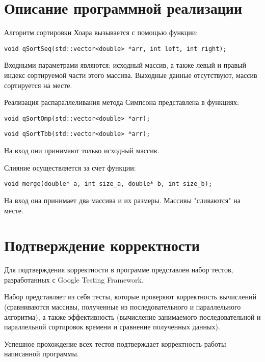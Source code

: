 \documentclass{report}
\begin{document}
\section*{Описание программной реализации}
Алгоритм сортировки Хоара вызывается с помощью функции:
\begin{lstlisting}
void qSortSeq(std::vector<double> *arr, int left, int right);
\end{lstlisting}
\par Входными параметрами являются: исходный массив, а также левый и правый индекс сортируемой части этого массива. Выходные данные отсутствуют, массив сортируется на месте.
\par Реализация распараллеливания метода Симпсона представлена в функциях:
\begin{lstlisting}
void qSortOmp(std::vector<double> *arr);
\end{lstlisting}
\begin{lstlisting}
void qSortTbb(std::vector<double> *arr);
\end{lstlisting}
\par На вход они принимают только исходный массив.
\par Слияние осуществляется за счет функции:
\begin{lstlisting}
void merge(double* a, int size_a, double* b, int size_b);
\end{lstlisting}
\par На вход она принимает два массива и их размеры. Массивы "сливаются" на месте.
\newpage

\section*{Подтверждение корректности}
Для подтверждения корректности в программе представлен набор тестов, разработанных с Google Testing Framework.
\par Набор представляет из себя тесты, которые проверяют корректность вычислений (сравниваются массивы, полученные из последовательного и параллельного алгоритма), а также эффективность (вычисление занимаемого последовательной и параллельной сортировок времени и сравнение полученных данных).
\par Успешное прохождение всех тестов подтверждает корректность работы написанной программы.
\newpage

\end{document}
